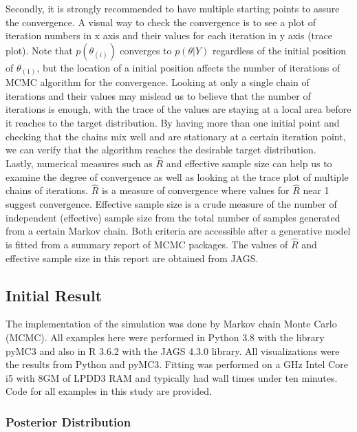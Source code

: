 \documentclass[12pt]{article}
\begin{document}
{Secondly, it is strongly recommended to have multiple starting points to assure the convergence. A visual way to check the convergence is to see a plot of  iteration numbers in x axis and their values for each iteration in y axis (trace plot). Note that $p(\theta_{(i)})$ converges to  $p(\theta|Y)$ regardless of the initial position of $\theta_{(1)}$, but the location of a initial position affects the number of iterations of MCMC algorithm for the convergence. Looking at only a single chain of iterations and their values may mislead us to believe that the number of iterations is enough, with the trace of the values are staying at a local area before it reaches to the target distribution. By having more than one initial point and checking that the chains mix well and are stationary at a certain iteration point, we can verify that the algorithm reaches the desirable target distribution. 
\\

Lastly, numerical measures such as $\hat{R}$ and effective sample size can help us to examine the degree of convergence as well as looking at the trace plot of multiple chains of iterations. $\hat{R}$ is a measure of convergence where values for $\hat{R}$ near 1 suggest convergence. Effective sample size is a crude measure of the number of independent (effective) sample size from the total number of samples generated from a certain Markov chain. Both criteria are accessible after a generative model is fitted from a summary report of MCMC packages. The values of $\hat{R}$ and effective sample size in this report are obtained from JAGS. \\


\subsection{Initial Result} 

The implementation of the simulation was done by Markov chain Monte Carlo (MCMC). All examples here were performed in Python 3.8 with the library pyMC3 \cite{pymc3} and also in R 3.6.2 \cite{r_lan} with the JAGS 4.3.0 \cite{jags} library. All visualizations were the results from Python and pyMC3. Fitting was performed on a GHz Intel Core i5 with 8GM of LPDD3 RAM and typically had wall times under ten minutes. Code for all examples in this study are provided. 

\subsubsection{Posterior Distribution}


}
\end{document}
